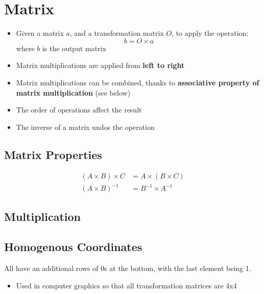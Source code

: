 \chapter{Matrix}

\begin{itemize}
  \item Given a matrix $ a $, and a transformation matrix $ O $, to apply
  the operation:
  \begin{equation}
    b = O \times a
  \end{equation}
  where $ b $ is the output matrix

  \item Matrix multiplications are applied from \textbf{left to right}
  \item Matrix multiplications can be combined, thanks to \textbf{associative
  property of matrix multiplication} (see below)
  \item The order of operations affect the result
  \item The inverse of a matrix undos the operation
\end{itemize}

\section{Matrix Properties}

  \begin{align}
    \left( A \times B \right) \times C &= A \times \left( B \times C \right) \\
    \left( A \times B \right)^{-1} &= B^{-1} \times A^{-1}
  \end{align}

\section{Multiplication}

\section{Homogenous Coordinates}

  All have an additional rows of 0s at the bottom, with the last element
  being 1.

  \begin{itemize}
    \item Used in computer graphics so that all transformation matrices
    are 4x4
  \end{itemize}
